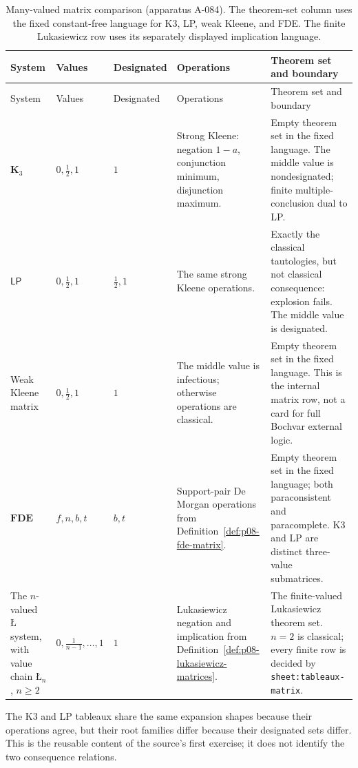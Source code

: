 \begin{landscape}
\begin{longtable}{@{}p{.10\linewidth}p{.16\linewidth}p{.13\linewidth}p{.27\linewidth}p{.25\linewidth}@{}}
\caption{Many-valued matrix comparison (apparatus A-084).  The theorem-set
column uses the fixed constant-free language for K3, LP, weak Kleene, and FDE.
The finite Lukasiewicz row uses its separately displayed implication language.}
\label{tab:p08-many-valued-matrices}\\
\toprule
System & Values & Designated & Operations & Theorem set and boundary \\
\midrule
\endfirsthead
\toprule
System & Values & Designated & Operations & Theorem set and boundary \\
\midrule
\endhead
\(\mathbf K_3\) & \(0,\tfrac12,1\) & \(1\) & Strong Kleene:
negation \(1-a\), conjunction minimum, disjunction maximum. & Empty theorem
set in the fixed language.  The middle value is nondesignated; finite
multiple-conclusion dual to LP. \\
\addlinespace
\(\mathsf{LP}\) & \(0,\tfrac12,1\) & \(\tfrac12,1\) & The same strong
Kleene operations. & Exactly the classical tautologies, but not classical
consequence: explosion fails.  The middle value is designated. \\
\addlinespace
Weak Kleene matrix & \(0,\tfrac12,1\) & \(1\) &
The middle value is infectious; otherwise operations are classical. & Empty
theorem set in the fixed language.  This is the internal matrix row, not a
card for full Bochvar external logic. \\
\addlinespace
\(\mathbf{FDE}\) & \(f,n,b,t\) &
\(b,t\) & Support-pair De Morgan operations from
Definition~\ref{def:p08-fde-matrix}. & Empty theorem set in the fixed language;
both paraconsistent and paracomplete.  K3 and LP are distinct three-value
submatrices. \\
\addlinespace
The \(n\)-valued \(\text{\L}\) system, with value chain \(\text{\L}_n\),
\(n\geq2\) &
\(0,\frac1{n-1},\ldots,1\) & \(1\) & Lukasiewicz negation and implication
from Definition~\ref{def:p08-lukasiewicz-matrices}. & The finite-valued
Lukasiewicz theorem set.  \(n=2\) is classical; every finite row is decided by
\texttt{sheet:tableaux-matrix}. \\
\bottomrule
\end{longtable}
\end{landscape}

The K3 and LP tableaux share the same expansion shapes because their
operations agree, but their root families differ because their designated sets
differ.  This is the reusable content of the source's first exercise; it does
not identify the two consequence relations.

